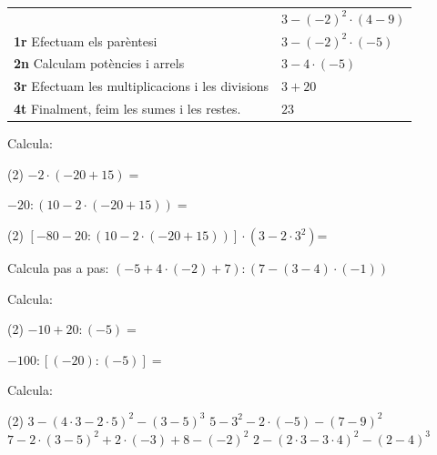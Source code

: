 \begin{theorybox}
	\begin{tabular}{ll}
		& $3 - (-2)^{2} \cdot ( 4 - 9)$ \\
		\textbf{1r} Efectuam els parèntesi          &     $ 3 - (-2)^{2} \cdot (-5)$ \\
		
		\textbf{2n} Calculam potències i arrels        &    $ 3 - 4 \cdot (-5)$     \\
		
		\textbf{3r} Efectuam les multiplicacions i les divisions &  $ 3 + 20$ \\
		
		\textbf{4t }Finalment, feim les sumes i les restes.       &                      $23$
	\end{tabular}
\end{theorybox}

\begin{mylist}
	\exer  \spen  Calcula:

\begin{tasks}(2)
	\task  $-2 \cdot (-20 + 15)  =$    
	
	\task  $-20 : \left(10 - 2\cdot (-20 + 15) \right) =$      
	
	\task*(2) $\left[-80 -20 : \left(10 - 2\cdot (-20 + 15) \right) \right] \cdot (3 - 2 \cdot 3^{2})$=
	
\end{tasks}
\vso
 	\answers{[$10$, $-1$, $1215$]}



	\exer  \spen  Calcula pas a pas:   $(-5 + 4 \cdot (-2) +7) : (7 - (3 - 4)\cdot (-1))$
\vsoo







	\exer  \spen  Calcula:

\begin{tasks}(2)
	\task $-10 + 20 : (-5) =$ 
 
	\task $-100 : \left[ (-20) : (-5) \right]=$ 
 
\end{tasks} 
\answers{[$-14$, $-25$]}



	
\exer[1]  Calcula:

\begin{tasks}(2)
\task $3-(4\cdot 3-2\cdot 5)^{2} -(3-5)^{3} $   \task $5-3^{2} -2\cdot (-5)-(7-9)^{2} $
\task $7-2\cdot (3-5)^{2} +2\cdot (-3)+8-(-2)^{2} $  \task $2-(2\cdot 3-3\cdot 4)^{2} -(2-4)^{3} $
\end{tasks} 
\answers[cols=2]{[$7$, $2$, $-3$, $-26$]}

\end{mylist}

